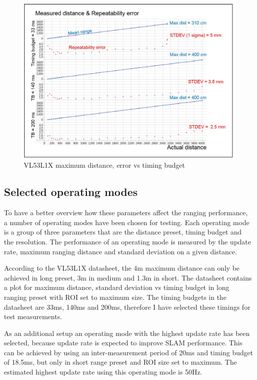 \begin{figure}[!ht]
    \centering
    \includegraphics[width=140mm, keepaspectratio]{figures/vl53l1x_timing_budget.png}
    \caption{VL53L1X maximum distance, error vs timing budget \cite{VL53L1XDatasheet}}
    \label{fig:vl53l1x_timing_budget}
\end{figure}

\subsection{Selected operating modes}
To have a better overview how these parameters affect the ranging performance, a number of operating modes 
have been chosen for testing. Each operating mode is a group of three parameters that are the distance preset,
timing budget and the resolution. The performance of an operating mode is measured by the update rate, maximum 
ranging distance and standard deviation on a given distance.

According to the VL53L1X datasheet, the 4m maximum distance can only be achieved in long preset, 3m in medium 
and 1.3m in short. The datasheet contains a plot for maximum distance, standard deviation vs timing budget
in long ranging preset with ROI set to maximum size. The timing budgets in the datasheet are 33ms, 
140ms and 200ms, therefore I have selected these timings for test measurements. 

As an additional setup an operating mode with the highest update rate has been selected, because update rate is
expected to improve SLAM performance. This can be achieved by using an inter-measurement period of 20ms and 
timing budget of 18.5ms, but only in short range preset and ROI size set to maximum. The estimated highest 
update rate using this operating mode is 50Hz.


